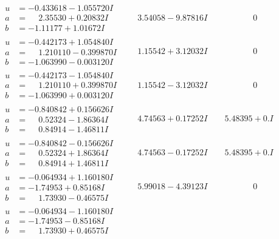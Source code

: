 \documentclass[1p]{elsarticle_modified}
\theoremstyle{definition}
\begin{document}
$$\begin{array}{c|c|c}
\begin{aligned}
u &= -0.433618 - 1.055720 I \\
a &= \phantom{-}2.35530 + 0.20832 I \\
b &= -1.11177 + 1.01672 I\end{aligned}
 & \phantom{-}3.54058 - 9.87816 I & \phantom{-0.000000 } 0 \\ \hline\begin{aligned}
u &= -0.442173 + 1.054840 I \\
a &= \phantom{-}1.210110 - 0.399870 I \\
b &= -1.063990 - 0.003120 I\end{aligned}
 & \phantom{-}1.15542 + 3.12032 I & \phantom{-0.000000 } 0 \\ \hline\begin{aligned}
u &= -0.442173 - 1.054840 I \\
a &= \phantom{-}1.210110 + 0.399870 I \\
b &= -1.063990 + 0.003120 I\end{aligned}
 & \phantom{-}1.15542 - 3.12032 I & \phantom{-0.000000 } 0 \\ \hline\begin{aligned}
u &= -0.840842 + 0.156626 I \\
a &= \phantom{-}0.52324 - 1.86364 I \\
b &= \phantom{-}0.84914 - 1.46811 I\end{aligned}
 & \phantom{-}4.74563 + 0.17252 I & \phantom{-}5.48395 + 0. I\phantom{ +0.000000I} \\ \hline\begin{aligned}
u &= -0.840842 - 0.156626 I \\
a &= \phantom{-}0.52324 + 1.86364 I \\
b &= \phantom{-}0.84914 + 1.46811 I\end{aligned}
 & \phantom{-}4.74563 - 0.17252 I & \phantom{-}5.48395 + 0. I\phantom{ +0.000000I} \\ \hline\begin{aligned}
u &= -0.064934 + 1.160180 I \\
a &= -1.74953 + 0.85168 I \\
b &= \phantom{-}1.73930 - 0.46575 I\end{aligned}
 & \phantom{-}5.99018 - 4.39123 I & \phantom{-0.000000 } 0 \\ \hline\begin{aligned}
u &= -0.064934 - 1.160180 I \\
a &= -1.74953 - 0.85168 I \\
b &= \phantom{-}1.73930 + 0.46575 I\end{aligned}

\end{array}$$
\end{document}
